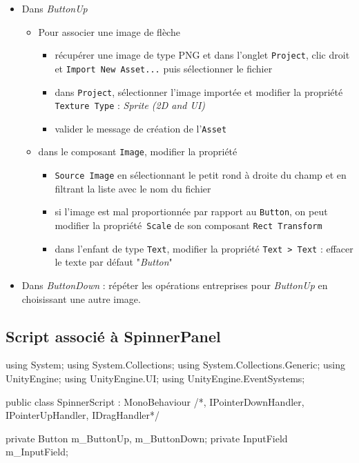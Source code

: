 \documentclass[a4paper,10pt]{article}
\newenvironment{solution}%
{\begin{tcolorbox}[breakable,colback=red!5!white,colframe=red!75!black,title=Solution]}%
{\end{tcolorbox}}
\newenvironment{boxcode}%
{\begin{tcolorbox}[breakable,colback=gray!5!white,colframe=black]}%
	{\end{tcolorbox}}
\begin{document}
\begin{solution}
\begin{itemize}
	\item Dans \textit{ButtonUp}
		\begin{itemize}
			\item Pour associer une image de flèche
			\begin{itemize}
				\item récupérer une image de type PNG et dans l'onglet \texttt{Project}, clic droit et \texttt{Import New Asset...} puis sélectionner le fichier
				\item dans \texttt{Project}, sélectionner l'image importée et modifier la propriété \texttt{Texture Type} : \textit{Sprite (2D and UI)}
				\item valider le message de création de l'\texttt{Asset}
			\end{itemize}	
			\item dans le composant \texttt{Image}, modifier la propriété
			\begin{itemize}
				\item \texttt{Source Image} en sélectionnant le petit rond à droite du champ et en filtrant la liste avec le nom du fichier
				\item si l'image est mal proportionnée par rapport au \texttt{Button}, on peut modifier la propriété\texttt{ Scale} de son composant \texttt{Rect Transform}
				\item dans l'enfant de type \texttt{Text}, modifier la propriété \texttt{Text > Text} : effacer le texte par défaut "\textit{Button}"
			\end{itemize}
		\end{itemize}	
	\item Dans \textit{ButtonDown} : répéter les opérations entreprises pour \textit{ButtonUp} en choisissant une autre image.
\end{itemize}

\subsection{Script associé à SpinnerPanel}
\begin{boxcode}
\begin{csharpsansbord}
using System;
using System.Collections;
using System.Collections.Generic;
using UnityEngine;
using UnityEngine.UI;
using UnityEngine.EventSystems;

public class SpinnerScript : MonoBehaviour
/*, IPointerDownHandler, IPointerUpHandler, IDragHandler*/
{
	private Button m_ButtonUp, m_ButtonDown;
	private InputField m_InputField;
	
}
\end{csharpsansbord}
\end{boxcode}
\end{solution}
\end{document}
